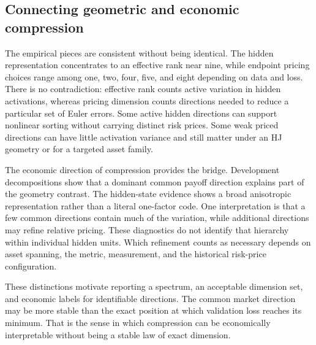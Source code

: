 \subsection{Connecting geometric and economic compression}

The empirical pieces are consistent without being identical. The hidden representation concentrates to an effective rank near nine, while endpoint pricing choices range among one, two, four, five, and eight depending on data and loss. There is no contradiction: effective rank counts active variation in hidden activations, whereas pricing dimension counts directions needed to reduce a particular set of Euler errors. Some active hidden directions can support nonlinear sorting without carrying distinct risk prices. Some weak priced directions can have little activation variance and still matter under an HJ geometry or for a targeted asset family.

The economic direction of compression provides the bridge. Development decompositions show that a dominant common payoff direction explains part of the geometry contrast. The hidden-state evidence shows a broad anisotropic representation rather than a literal one-factor code. One interpretation is that a few common directions contain much of the variation, while additional directions may refine relative pricing. These diagnostics do not identify that hierarchy within individual hidden units. Which refinement counts as necessary depends on asset spanning, the metric, measurement, and the historical risk-price configuration.

These distinctions motivate reporting a spectrum, an acceptable dimension set, and economic labels for identifiable directions. The common market direction may be more stable than the exact position at which validation loss reaches its minimum. That is the sense in which compression can be economically interpretable without being a stable law of exact dimension.
